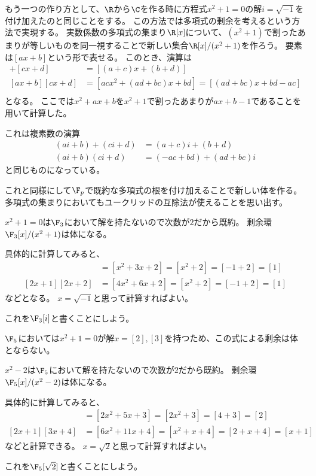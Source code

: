 \documentclass[uplatex]{jsarticle}
\begin{document}
もう一つの作り方として、$\R$から$\C$を作る時に方程式$x^2+1=0$の解$i=\sqrt{-1}$を付け加えたのと同じことをする。
この方法では多項式の剰余を考えるという方法で実現する。
実数係数の多項式の集まり$\R[x]$について、$(x^2+1)$で割ったあまりが等しいものを同一視することで新しい集合$\R[x]/(x^2+1)$を作ろう。
要素は$[ax+b]$という形で表せる。
このとき、演算は
\begin{align*}
  [ax+b]+[cx+d]&=[(a+c)x+(b+d)]\\
  [ax+b][cx+d]&=[acx^2+(ad+bc)x+bd]=[(ad+bc)x+bd-ac]\\
\end{align*}
となる。
ここでは$x^2+ax+b$を$x^2+1$で割ったあまりが$ax+b-1$であることを用いて計算した。

これは複素数の演算
\begin{align*}
  (ai+b)+(ci+d)&=(a+c)i+(b+d)\\
  (ai+b)(ci+d)&=(-ac+bd)+(ad+bc)i
\end{align*}
と同じものになっている。

これと同様にして$\F_p$で既約な多項式の根を付け加えることで新しい体を作る。
多項式の集まりにおいてもユークリッドの互除法が使えることを思い出す。

\begin{eg}
  $x^2+1=0$は$\F_3$において解を持たないので次数が$2$だから既約。
  剰余環$\F_3[x]/(x^2+1)$は体になる。

  具体的に計算してみると、
  \begin{align*}
    [x+1][x+2]&=[x^2+3x+2]=[x^2+2]=[-1+2]=[1]\\
    [2x+1][2x+2]&=[4x^2+6x+2]=[x^2+2]=[-1+2]=[1]
  \end{align*}
  などとなる。
  $x=\sqrt{-1}$と思って計算すればよい。

  これを$\F_3[i]$と書くことにしよう。
\end{eg}

$\F_5$においては$x^2+1=0$が解$x=[2],[3]$を持つため、この式による剰余は体とならない。

\begin{eg}
  $x^2-2$は$\F_5$において解を持たないので次数が$2$だから既約。
  剰余環$\F_5[x]/(x^2-2)$は体になる。

  具体的に計算してみると、
  \begin{align*}
    [x+1][2x+3]&=[2x^2+5x+3]=[2x^2+3]=[4+3]=[2]\\
    [2x+1][3x+4]&=[6x^2+11x+4]=[x^2+x+4]=[2+x+4]=[x+1]
  \end{align*}
  などと計算できる。
  $x=\sqrt{2}$と思って計算すればよい。

  これを$\F_5[\sqrt{2}]$と書くことにしよう。
\end{eg}
\end{document}
